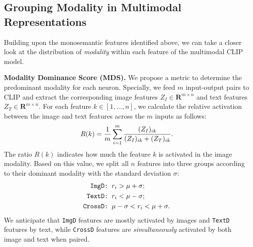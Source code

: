 \subsection{Grouping Modality in Multimodal Representations}
Building upon the monosemantic features identified above, we can take a closer look at the distribution of \emph{modality} within each feature of the multimodal CLIP model.

\textbf{Modality Dominance  Score (MDS).}
We propose a metric to determine the predominant modality for each neuron. Specially, we feed $m$ input-output pairs to CLIP and extract the corresponding image features $Z_{I}\in \mathbf{R}^{m \times n}$ and text features $Z_{T}\in \mathbf{R}^{m\times n}$. For each feature $k\in[1,\dots,n]$, we calculate the relative activation between the image and text features across the $m$ inputs as follows: 
\begin{align}
\small
   R(k)=\frac{1}{m}\sum_{i=1}^m\frac{(Z_I)_{ik}}{(Z_I)_{ik}+(Z_T)_{ik}}. \nonumber 
\end{align}
The ratio $R(k)$ indicates how much the feature $k$ is activated in the image modality. Based on this value, we split all $n$ features into three groups according to their dominant modality with the standard deviation $\sigma$: 
 \begin{align}
\vspace{-5mm}
    \texttt{ImgD: } & r_{i} > \mu+\sigma; \nonumber \\
    \texttt{TextD: } & r_{i} <\mu-\sigma; \nonumber \\ \texttt{CrossD: } & \mu-\sigma <r_{i} <\mu+\sigma.
    \nonumber
\vspace{-10mm}
\end{align}
We anticipate that \texttt{ImgD} features are mostly activated by images and \texttt{TextD} features by text, while \texttt{CrossD} features are \emph{simultaneously} activated by both image and text when paired.

